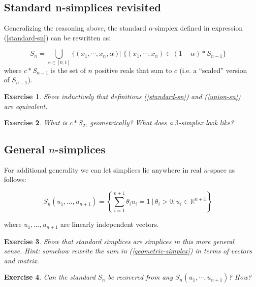 \documentclass{tufte-handout}
\newtheorem{exercise}{Exercise}
\newcommand{\re}{\mathbb{R}}
\begin{document}
\subsection{Standard n-simplices revisited}
Generalizing the reasoning above, the standard $n$-simplex defined in expression (\ref{standard-sn}) can be rewritten as:


\begin{equation}
    S_n = \bigcup_{\alpha\in[0,1]} \{(x_1,\cdots,x_n,\alpha) | \ \{(x_1,\cdots,x_n)\in (1-\alpha)*S_{n-1}  \}
\label{union-sn}
\end{equation}
where $c*S_{n-1}$ is the set of $n$ positive reals that sum to $c$ (i.e. a ``scaled'' version of $S_{n-1}$).
\begin{exercise}
Show inductively that definitions (\ref{standard-sn}) and (\ref{union-sn}) are equivalent.
\end{exercise}
\begin{exercise}
What is $c*S_2$, geometrically? What does a $3$-simplex look like?
\end{exercise}
\subsection{General $n$-simplices}
For additional generality we can let simplices lie anywhere in real $n$-space as follows:

\begin{equation}
    S_{n}(u_1,\ldots,u_{n+1}) = \left\{\sum_{i=1}^{n+1} \theta_i u_i = 1\ |\  \theta_i>0; u_i\in \re^{n+1} \right\}
    \label{geometric-simplex}
\end{equation}

where $u_1,\ldots,u_{n+1}$ are linearly independent vectors. 

\begin{exercise}
Show that standard simplices are simplices in this more general sense. Hint: somehow rewrite the sum in (\ref{geometric-simplex}) in terms of vectors and matrix.
\end{exercise}
\begin{exercise}
Can the standard $S_n$ be recovered from any $S_n(u_1,\cdots,u_{n+1})$? How?
\end{exercise}
\end{document}
